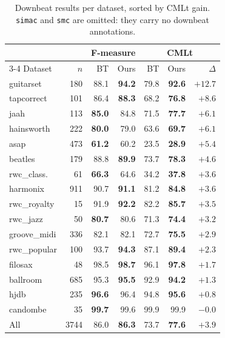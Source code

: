 \begin{table}[t]
  \centering
  \caption{Downbeat results per dataset, sorted by CMLt gain. \texttt{simac} and
  \texttt{smc} are omitted: they carry no downbeat annotations.}
  \label{tab:perdataset}
  \footnotesize
  \setlength{\tabcolsep}{4pt}
  \begin{tabular}{@{}lr rr rrr@{}}
    \hline
    & & \multicolumn{2}{c}{F-measure} & \multicolumn{3}{c}{CMLt} \\
    \cline{3-4}\cline{5-7}
    Dataset & $n$ & BT & Ours & BT & Ours & $\Delta$ \\
    \hline
    guitarset & 180 & 88.1 & \textbf{94.2} & 79.8 & \textbf{92.6} & $+12.7$ \\
    tapcorrect & 101 & 86.4 & \textbf{88.3} & 68.2 & \textbf{76.8} & $+8.6$ \\
    jaah & 113 & \textbf{85.0} & 84.8 & 71.5 & \textbf{77.7} & $+6.1$ \\
    hainsworth & 222 & \textbf{80.0} & 79.0 & 63.6 & \textbf{69.7} & $+6.1$ \\
    asap & 473 & \textbf{61.2} & 60.2 & 23.5 & \textbf{28.9} & $+5.4$ \\
    beatles & 179 & 88.8 & \textbf{89.9} & 73.7 & \textbf{78.3} & $+4.6$ \\
    rwc\_class. & 61 & \textbf{66.3} & 64.6 & 34.2 & \textbf{37.8} & $+3.6$ \\
    harmonix & 911 & 90.7 & \textbf{91.1} & 81.2 & \textbf{84.8} & $+3.6$ \\
    rwc\_royalty & 15 & 91.9 & \textbf{92.2} & 82.2 & \textbf{85.7} & $+3.5$ \\
    rwc\_jazz & 50 & \textbf{80.7} & 80.6 & 71.3 & \textbf{74.4} & $+3.2$ \\
    groove\_midi & 336 & 82.1 & 82.1 & 72.7 & \textbf{75.5} & $+2.9$ \\
    rwc\_popular & 100 & 93.7 & \textbf{94.3} & 87.1 & \textbf{89.4} & $+2.3$ \\
    filosax & 48 & 98.5 & \textbf{98.7} & 96.1 & \textbf{97.8} & $+1.7$ \\
    ballroom & 685 & 95.3 & \textbf{95.5} & 92.9 & \textbf{94.2} & $+1.3$ \\
    hjdb & 235 & \textbf{96.6} & 96.4 & 94.8 & \textbf{95.6} & $+0.8$ \\
    candombe & 35 & \textbf{99.7} & 99.6 & 99.9 & 99.9 & $-0.0$ \\
    \hline
    All & 3744 & 86.0 & \textbf{86.3} & 73.7 & \textbf{77.6} & $+3.9$ \\
    \hline
  \end{tabular}
\end{table}
